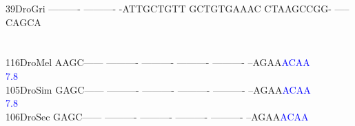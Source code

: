 \documentclass[11pt,twoside,reqno,a4paper]{article}
\begin{document}
{39\hspace*{2\charwidth}DroGri	----------	----------	-ATTGCTGTT	GCTGTGAAAC	CTAAGCCGG-	-----CAGCA	\\
\hspace*{4\charwidth}\hspace*{7\charwidth}\hspace*{1\charwidth}\hspace*{1\charwidth}\hspace*{1\charwidth}\hspace*{1\charwidth}\hspace*{1\charwidth}\hspace*{1\charwidth}\\
\\
116\hspace*{1\charwidth}DroMel	AAGC------	----------	----------	----------	----------	--AGAA\textcolor{Blue}{A}\textcolor{Blue}{C}\textcolor{Blue}{A}\textcolor{Blue}{A}	\\
\hspace*{4\charwidth}\hspace*{7\charwidth}\hspace*{1\charwidth}\hspace*{1\charwidth}\hspace*{1\charwidth}\hspace*{1\charwidth}\hspace*{1\charwidth}\hspace*{56\charwidth}\textcolor{Blue}{7.8}\hspace*{1\charwidth}\\
105\hspace*{1\charwidth}DroSim	GAGC------	----------	----------	----------	----------	--AGAA\textcolor{Blue}{A}\textcolor{Blue}{C}\textcolor{Blue}{A}\textcolor{Blue}{A}	\\
\hspace*{4\charwidth}\hspace*{7\charwidth}\hspace*{1\charwidth}\hspace*{1\charwidth}\hspace*{1\charwidth}\hspace*{1\charwidth}\hspace*{1\charwidth}\hspace*{56\charwidth}\textcolor{Blue}{7.8}\hspace*{1\charwidth}\\
106\hspace*{1\charwidth}DroSec	GAGC------	----------	----------	----------	----------	--AGAA\textcolor{Blue}{A}\textcolor{Blue}{C}\textcolor{Blue}{A}\textcolor{Blue}{A}	\\
}
\end{document}
